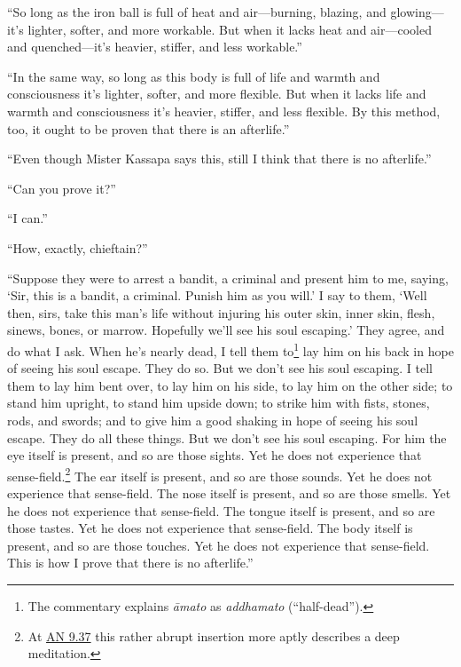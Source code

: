 \documentclass[12pt,openany]{book}%
\begin{document}
“So long as the iron ball is full of heat and air—burning, blazing, and glowing—it’s lighter, softer, and more workable. But when it lacks heat and air—cooled and quenched—it’s heavier, stiffer, and less workable.” 

“In the same way, so long as this body is full of life and warmth and consciousness it’s lighter, softer, and more flexible. But when it lacks life and warmth and consciousness it’s heavier, stiffer, and less flexible. By this method, too, it ought to be proven that there is an afterlife.” 

“Even though Mister Kassapa says this, still I think that there is no afterlife.” 

“Can you prove it?” 

“I can.” 

“How, exactly, chieftain?” 

“Suppose they were to arrest a bandit, a criminal and present him to me, saying, ‘Sir, this is a bandit, a criminal. Punish him as you will.’ I say to them, ‘Well then, sirs, take this man’s life without injuring his outer skin, inner skin, flesh, sinews, bones, or marrow. Hopefully we’ll see his soul escaping.’ They agree, and do what I ask. When he’s nearly dead, I tell them to\footnote{The commentary explains \textit{\textsanskrit{āmato}} as \textit{addhamato} (“half-dead”). } lay him on his back in hope of seeing his soul escape. They do so. But we don’t see his soul escaping. I tell them to lay him bent over, to lay him on his side, to lay him on the other side; to stand him upright, to stand him upside down; to strike him with fists, stones, rods, and swords; and to give him a good shaking in hope of seeing his soul escape. They do all these things. But we don’t see his soul escaping. For him the eye itself is present, and so are those sights. Yet he does not experience that sense-field.\footnote{At \href{https://suttacentral.net/an9.37/en/sujato}{AN 9.37} this rather abrupt insertion more aptly describes a deep meditation. } The ear itself is present, and so are those sounds. Yet he does not experience that sense-field. The nose itself is present, and so are those smells. Yet he does not experience that sense-field. The tongue itself is present, and so are those tastes. Yet he does not experience that sense-field. The body itself is present, and so are those touches. Yet he does not experience that sense-field. This is how I prove that there is no afterlife.” 
\end{document}
